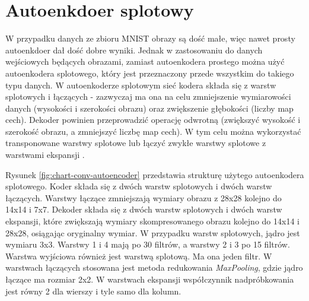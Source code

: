 \documentclass[12pt]{mwbk}
\theoremstyle{plain}
\theoremstyle{definition}
\theoremstyle{remark}
\begin{document}
\section{Autoenkdoer splotowy}

W przypadku danych ze zbioru MNIST obrazy są dość małe, więc nawet prosty autoenkdoer dał dość dobre wyniki.
Jednak w zastosowaniu do danych wejściowych będących obrazami, zamiast autoenkodera prostego można użyć autoenkodera splotowego, który jest przeznaczony przede wszystkim do takiego typu danych. W autoenkoderze splotowym sieć kodera składa się z warstw splotowych i łączących - zazwyczaj ma ona na celu zmniejszenie wymiarowości danych (wysokości i szerokości obrazu) oraz zwiększenie głębokości (liczby map cech). Dekoder powinien przeprowadzić operację odwrotną (zwiększyć wysokość i szerokość obrazu, a zmniejszyć liczbę map cech). W tym celu można wykorzystać transponowane warstwy splotowe lub łączyć zwykłe warstwy splotowe z warstwami ekspansji \cite{geron}.

Rysunek \ref{fig:chart-conv-autoencoder} przedstawia strukturę użytego autoenkodera splotowego. Koder składa się z dwóch warstw splotowych i dwóch warstw łączących. Warstwy łączące zmniejszają wymiary obrazu z 28x28 kolejno do 14x14 i 7x7. Dekoder składa się z dwóch warstw splotowych i dwóch warstw ekspansji, które zwiększają wymiary skompresowanego obrazu kolejno do 14x14 i 28x28, osiągając oryginalny wymiar. W przypadku warstw splotowych, jądro jest wymiaru 3x3. Warstwy 1 i 4 mają po 30 filtrów, a warstwy 2 i 3 po 15 filtrów. Warstwa wyjściowa również jest warstwą splotową. Ma ona jeden filtr. W warstwach łączących stosowana jest metoda redukowania \emph{MaxPooling}, gdzie jądro łączące ma rozmiar 2x2. W warstwach ekspansji współczynnik nadpróbkowania  jest równy 2 dla wierszy i tyle samo dla kolumn.
\end{document}
